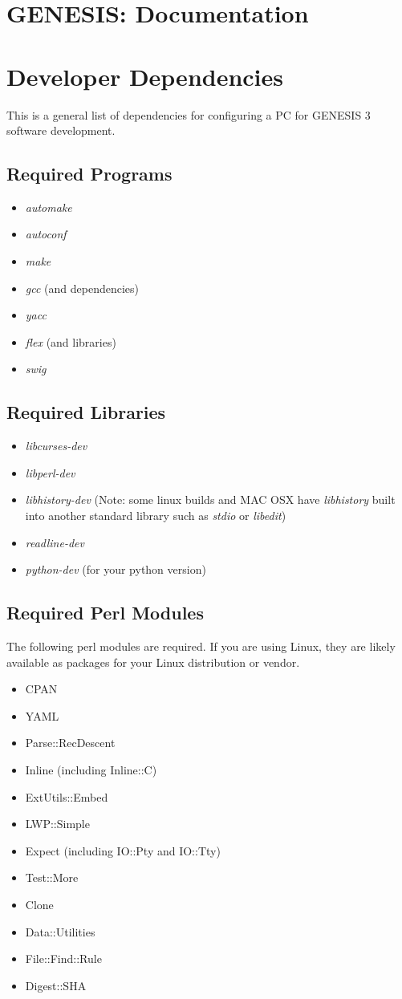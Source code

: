 \documentclass[12pt]{article}
\begin{document}
\section*{GENESIS: Documentation}

\section*{Developer Dependencies}

This is a general list of dependencies for configuring a PC for
GENESIS 3 software development.

\subsection*{Required Programs}

\begin{itemize}
   \item {\it automake}
   \item {\it autoconf}
   \item {\it make}
   \item {\it gcc} (and dependencies)
   \item {\it yacc}
   \item {\it flex} (and libraries)
   \item {\it swig}
\end{itemize} 

\subsection*{Required Libraries}

\begin{itemize}
   \item {\it libcurses-dev}
   \item {\it libperl-dev}
   \item {\it libhistory-dev} (Note: some linux builds and MAC OSX have {\it libhistory} built into another standard library such as {\it stdio} or {\it libedit})
   \item {\it readline-dev}
   \item {\it python-dev} (for your python version) 
\end{itemize} 

\subsection*{Required Perl Modules}

The following perl modules are required.  If you are using Linux, they
are likely available as packages for your Linux distribution or vendor.

\begin{itemize}
\item CPAN
\item YAML
\item Parse::RecDescent
\item Inline (including Inline::C)
\item ExtUtils::Embed
\item LWP::Simple
\item Expect (including IO::Pty and IO::Tty)
\item Test::More
\item Clone
\item Data::Utilities
\item File::Find::Rule
\item Digest::SHA
\end{itemize}
\end{document}
